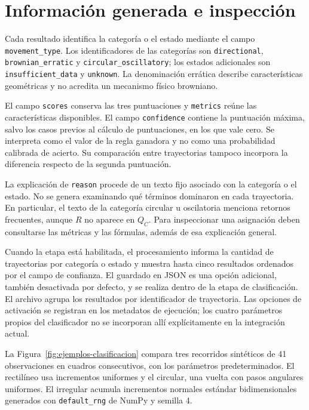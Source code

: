 \section{Información generada e inspección}

Cada resultado identifica la categoría o el estado mediante el campo \texttt{movement\_type}. Los identificadores de las categorías son \texttt{directional}, \texttt{brownian\_erratic} y \texttt{circular\_oscillatory}; los estados adicionales son \texttt{insufficient\_data} y \texttt{unknown}. La denominación errática describe características geométricas y no acredita un mecanismo físico browniano.

El campo \texttt{scores} conserva las tres puntuaciones y \texttt{metrics} reúne las características disponibles. El campo \texttt{confidence} contiene la puntuación máxima, salvo los casos previos al cálculo de puntuaciones, en los que vale cero. Se interpreta como el valor de la regla ganadora y no como una probabilidad calibrada de acierto. Su comparación entre trayectorias tampoco incorpora la diferencia respecto de la segunda puntuación.

La explicación de \texttt{reason} procede de un texto fijo asociado con la categoría o el estado. No se genera examinando qué términos dominaron en cada trayectoria. En particular, el texto de la categoría circular u oscilatoria menciona retornos frecuentes, aunque $R$ no aparece en $Q_C$. Para inspeccionar una asignación deben consultarse las métricas y las fórmulas, además de esa explicación general.

Cuando la etapa está habilitada, el procesamiento informa la cantidad de trayectorias por categoría o estado y muestra hasta cinco resultados ordenados por el campo de confianza. El guardado en JSON es una opción adicional, también desactivada por defecto, y se realiza dentro de la etapa de clasificación. El archivo agrupa los resultados por identificador de trayectoria. Las opciones de activación se registran en los metadatos de ejecución; los cuatro parámetros propios del clasificador no se incorporan allí explícitamente en la integración actual.

La Figura~\ref{fig:ejemplos-clasificacion} compara tres recorridos sintéticos de 41 observaciones en cuadros consecutivos, con los parámetros predeterminados. El rectilíneo usa incrementos uniformes y el circular, una vuelta con pasos angulares uniformes. El irregular acumula incrementos normales estándar bidimensionales generados con \texttt{default\_rng} de NumPy y semilla 4.

